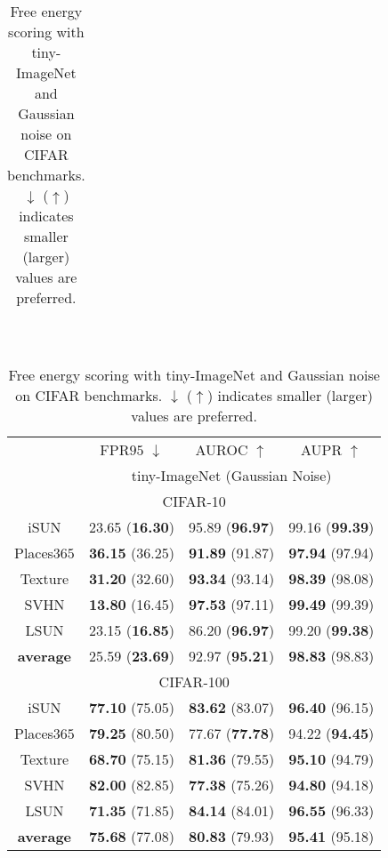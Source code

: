 \documentclass{article}
\begin{document}
\begin{table}[t]
{{\begin{tabular}{c|ccc}
\end{tabular}
}}~~~~
\parbox{.47\linewidth}{
\centering
\caption{Free energy scoring with tiny-ImageNet and Gaussian noise on CIFAR benchmarks. $\downarrow$ ($\uparrow$) indicates smaller (larger) values are preferred.} \label{tab: free energy tiny}
\vspace{5pt}
\scriptsize{
\begin{tabular}{c|ccc}
\toprule[1.5pt]
                   & FPR$95$ $\downarrow$     & AUROC $\uparrow$       & AUPR $\uparrow$      \\
                   \cline{2-4} 
\multirow{-2}{*}{} & \multicolumn{3}{c}{tiny-ImageNet (Gaussian Noise)} \\
\midrule[0.6pt]
\multicolumn{4}{c}{\cellcolor{greyL}CIFAR-10} \\
\midrule[0.6pt]
iSUN               & {23.65} (\textbf{16.30}) & {95.89} (\textbf{96.97}) & {99.16} (\textbf{99.39}) \\
Places$365$        & \textbf{36.15} (36.25) & \textbf{91.89} (91.87) & \textbf{97.94} (97.94) \\
Texture            & \textbf{31.20} (32.60) & \textbf{93.34} (93.14) & \textbf{98.39} (98.08) \\
SVHN               & \textbf{13.80} (16.45) & \textbf{97.53} (97.11) & \textbf{99.49} (99.39) \\
LSUN             & {23.15} (\textbf{16.85}) & {86.20} (\textbf{96.97}) & {99.20} (\textbf{99.38}) \\
\midrule
\textbf{average}   & {25.59} (\textbf{23.69}) & {92.97} (\textbf{95.21}) & \textbf{98.83} (98.83) \\ \midrule[1pt]
\multicolumn{4}{c}{\cellcolor{greyL}CIFAR-100} \\
\midrule[1pt]
iSUN               & \textbf{77.10} (75.05) & \textbf{83.62} (83.07) & \textbf{96.40} (96.15) \\ 
Places$365$        & \textbf{79.25} (80.50) & {77.67} (\textbf{77.78}) & {94.22} (\textbf{94.45}) \\
Texture            & \textbf{68.70} (75.15) & \textbf{81.36} (79.55) & \textbf{95.10} (94.79) \\
SVHN               & \textbf{82.00} (82.85) & \textbf{77.38} (75.26) & \textbf{94.80} (94.18) \\
LSUN               & \textbf{71.35} (71.85) & \textbf{84.14} (84.01) & \textbf{96.55} (96.33) \\
\midrule
\textbf{average}   & \textbf{75.68} (77.08) & \textbf{80.83} (79.93) & \textbf{95.41} (95.18) \\ \bottomrule[1.5pt]      
\end{tabular}
}}
\end{table}
\end{document}
